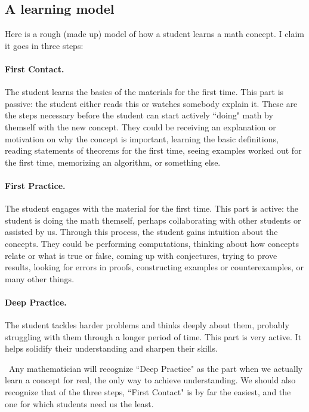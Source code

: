 \documentclass[11pt]{article}
\begin{document}
	\subsection{A learning model}
	\label{sec:model}

	Here is a rough (made up) model of how a student learns a math concept. I
	claim it goes in three steps:
	\paragraph{First Contact.}
	The student learns the basics of the materials for the first time. This part is
	passive: the student either reads this or watches somebody explain it. These are
	the steps necessary before the student can start actively ``doing" math by
	themself with the new concept. They could be receiving an explanation or motivation
	on why the concept is important, learning the basic definitions, reading statements
	of theorems for the first time, seeing examples worked out for the first time,
	memorizing an algorithm, or something else.
	\paragraph{First Practice.}
	The student engages with the material for the first time. This part is active:
	the student is doing the math themself, perhaps collaborating with other students
	or assisted by us. Through this process, the student gains intuition about the
	concepts. They could be performing computations, thinking about how concepts relate
	or what is true or false, coming up with conjectures, trying to prove results,
	looking for errors in proofs, constructing examples or counterexamples, or
	many other things.
	\paragraph{Deep Practice.}
	The student tackles harder problems and thinks deeply about them, probably struggling
	with them through a longer period of time. This part is very active. It helps solidify
	their understanding and sharpen their skills.

	\
 Any mathematician will recognize ``Deep Practice" as the part when we
	actually learn a concept for real, the only way to achieve understanding. We
	should also recognize that of the three steps, ``First Contact" is by far the
	easiest, and the one for which students need us the least.

\end{document}
